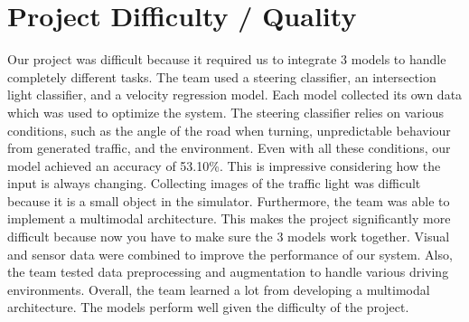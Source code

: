 \documentclass{article} %
\begin{document}
\section{Project Difficulty / Quality}

Our project was difficult because it required us to integrate 3 models to handle completely different
tasks. The team used a steering classifier, an intersection light classifier, and a velocity regression
model. Each model collected its own data which was used to optimize the system. The steering classifier
relies on various conditions, such as the angle of the road when turning, unpredictable behaviour from
generated traffic, and the environment. Even with all these conditions, our model achieved an accuracy
of 53.10\%. This is impressive considering how the input is always changing. Collecting images of the traffic light was difficult because it is a small object in the simulator.
Furthermore, the team was able to implement a multimodal architecture. This makes the project
significantly more difficult because now you have to make sure the 3 models work together. Visual and
sensor data were combined to improve the performance of our system. Also, the team tested data
preprocessing and augmentation to handle various driving environments. Overall, the team learned a lot from developing a multimodal architecture. The models perform well given
the difficulty of the project.



\label{last_page}



\end{document}
